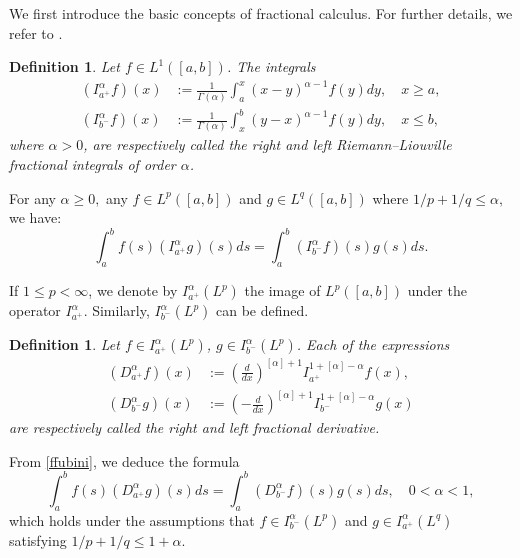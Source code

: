 \documentclass{article}
\newtheorem{definition}[theorem]{Definition}
\theoremstyle{definition}  %
\theoremstyle{plain}  %
\begin{document}
We first introduce the basic concepts of fractional calculus. For further details, we refer to \cite{Samko1993}.
 \begin{definition}
   	Let $f\in L^1([a,b])$. The integrals 
   	\begin{align*}
   		(I_{a^+}^\alpha f)(x)&:=\frac{1}{\Gamma(\alpha)}\int_a^x (x-y)^{\alpha-1}f(y)dy,\quad x\geq a,\\
   		(I_{b^-}^\alpha f)(x)&:=\frac{1}{\Gamma(\alpha)}\int_x^b (y-x)^{\alpha-1}f(y)dy,\quad x\leq b,
   	\end{align*}
   	where $\alpha>0$, are respectively called the right and left Riemann--Liouville fractional integrals of order $\alpha$.

   \end{definition}
   
   For any $\alpha\geq 0,$ any $f\in L^p([a,b])$ and $g\in L^q([a,b])$ where $1/p+1/q\leq \alpha,$ we have:
   \begin{equation}
   	\int_a^b f(s)(I_{a^+}^\alpha g)(s)ds=\int _a^b (I_{b^-}^\alpha f)(s) g(s) ds.\label{ffubini}
   \end{equation}
   
   	
   	If $1 \leq p < \infty$, we denote by $I_{a^+}^\alpha(L^p)$ the image of $L^p([a,b])$ under the operator $I_{a^+}^\alpha$. Similarly, $I_{b^-}^\alpha(L^p)$ can be defined.

   	
   	\begin{definition}
   		 Let $f\in I_{a^+}^\alpha(L^p) $, $g\in I_{b^-}^\alpha(L^p) $.
   		 Each of the expressions 
   		 \begin{align*}
   		(D_{a^+}^\alpha f)(x)&:=\left(\frac{d}{dx} \right)^{[\alpha]+1}I_{a^+}^{1+[\alpha]-\alpha}f(x),\\
   		(D_{b^-}^\alpha g)(x)&:=\left(-\frac{d}{dx} \right)^{[\alpha]+1}I_{b^-}^{1+[\alpha]-\alpha}g(x)
   	   	\end{align*}
   		 are respectively called the right and left fractional derivative.
   \end{definition}
  From \eqref{ffubini}, we deduce the formula  
\begin{equation}
  \int_a^b f(s)(D_{a^+}^\alpha g)(s)ds
  =\int _a^b (D_{b^-}^\alpha f)(s) g(s) ds,\quad 0<\alpha<1, \label{fffubini}
\end{equation}
which holds under the assumptions that \( f\in I^\alpha_{b^-}(L^p) \) and \( g\in I^\alpha_{a^+}(L^q) \) satisfying \( 1/p+1/q\leq 1+\alpha \).
   
\end{document}
